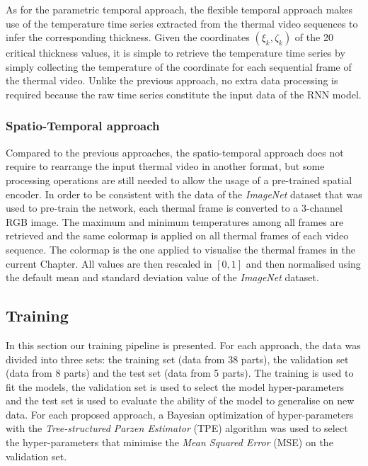 As for the parametric temporal approach, the flexible temporal approach makes use of the temperature time series extracted from the thermal video sequences to infer the corresponding thickness. Given the coordinates $(\xi_{k}, \zeta_{k})$ of the 20 critical thickness values, it is simple to retrieve the temperature time series by simply collecting the temperature of the coordinate for each sequential frame of the thermal video. Unlike the previous approach, no extra data processing is required because the raw time series constitute the input data of the RNN model. 

\subsubsection{Spatio-Temporal approach}
Compared to the previous approaches, the spatio-temporal approach does not require to rearrange the input thermal video in another format, but some processing operations are still needed to allow the usage of a pre-trained spatial encoder. In order to be consistent with the data of the \textit{ImageNet} dataset \citep{deng2009imagenet} that was used  to pre-train the network, each thermal frame is converted to a 3-channel RGB image. The maximum and minimum temperatures among all frames are retrieved and the same colormap is applied on all thermal frames of each video sequence. The colormap is the one applied to visualise the thermal frames in the current Chapter. All values are then rescaled in $[0, 1]$ and then normalised using the default mean and standard deviation value of the \textit{ImageNet} dataset.

\subsection{Training}

In this section our training pipeline is presented. For each approach, the data was divided into three sets: the training set (data from 38 parts), the validation set (data from 8 parts) and the test set (data from 5 parts). The training is used to fit the models, the validation set is used to select the model hyper-parameters and the test set is used to evaluate the ability of the model to generalise on new data. For each proposed approach, a Bayesian optimization of hyper-parameters with the \textit{Tree-structured Parzen Estimator} (TPE) \citep{bergstra2011algorithms} algorithm was used to select the hyper-parameters that minimise the \textit{Mean Squared Error} (MSE) on the validation set.


